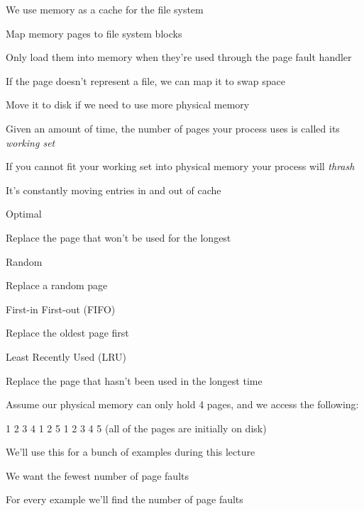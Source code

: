 \begin{slide}


    We use memory as a cache for the file system
    \medskip

    Map memory pages to file system blocks

    \leftspace{}Only load them into memory when they're used through
    the page fault handler
    \medskip

    If the page doesn't represent a file, we can map it to swap space

    \leftspace{}Move it to disk if we need to use more physical memory

\end{slide}

\begin{slide}


    Given an amount of time, the number of pages your process uses
    is called
    its \textit{working set}
    \medskip

    If you cannot fit your working set into physical memory your process
    will \textit{thrash}

    \leftspace{}It's constantly moving entries in and out of cache

\end{slide}

\begin{slide}


    Optimal

    \leftspace{}Replace the page that won't be used for the longest
    \medskip

    Random

    \leftspace{}Replace a random page
    \medskip

    First-in First-out (FIFO)

    \leftspace{}Replace the oldest page first
    \medskip

    Least Recently Used (LRU)

    \leftspace{}Replace the page that hasn't been used in the longest time

\end{slide}

\begin{slide}


    Assume our physical memory can only hold 4 pages, and we access the following:

    \leftspace{}1 2 3 4 1 2 5 1 2 3 4 5 (all of the pages are initially on disk)
    \medskip

    We'll use this for a bunch of examples during this lecture

    \leftspace{}We want the fewest number of page faults
    \medskip

    For every example we'll find the number of page faults

\end{slide}

